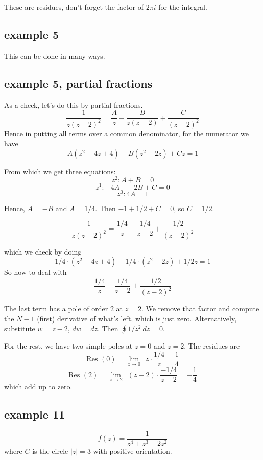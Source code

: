 \documentclass[11pt, oneside]{article}
\begin{document}
These are residues, don't forget the factor of $2 \pi i$ for the integral.

\subsection*{example 5}

This can be done in many ways.

\subsection*{example 5, partial fractions}

\label{sec:ex5PF}

As a check, let's do this by partial fractions.
\[ \frac{1}{z(z-2)^2} = \frac{A}{z} +  \frac{B}{z(z-2)} +  \frac{C}{(z-2)^2}  \]
Hence in putting all terms over a common denominator, for the numerator we have
\[ A(z^2 - 4z + 4) + B(z^2 - 2z) + Cz = 1 \]

From which we get three equations:
\[ z^2:  A + B = 0 \]
\[ z^1: -4A + -2B + C = 0 \]
\[ z^0:  4A = 1 \]

Hence, $A = -B$ and $A = 1/4$. Then $-1 + 1/2 + C = 0$, so $C = 1/2$.

\[ \frac{1}{z(z-2)^2} = \frac{1/4}{z} - \frac{1/4}{z-2} +  \frac{1/2}{(z-2)^2}  \]

which we check by doing
\[ 1/4 \cdot (z^2 - 4z + 4) - 1/4 \cdot (z^2 - 2z) + 1/2 z = 1 \]
So how to deal with 
\[ \frac{1/4}{z} - \frac{1/4}{z-2} +  \frac{1/2}{(z-2)^2}  \]

The last term has a pole of order $2$ at $z = 2$.  We remove that factor and compute the $N-1$ (first) derivative of what's left, which is just zero.  Alternatively, substitute $w = z - 2$, $dw = dz$.  Then $\oint 1/z^2 \ dz = 0$.

For the rest, we have two simple poles at $z=0$ and $z=2$.  The residues are
\[ \text{Res } (0) = \lim_{z \rightarrow 0} \ \ z \cdot \frac{1/4}{z} = \frac{1}{4} \]
\[ \text{Res } (2) = \lim_{z \rightarrow 2} \ \ (z-2) \cdot \frac{-1/4}{z-2} = - \frac{1}{4} \]
which add up to zero.

\subsection*{example  11}

\label{sec:ex11R}

\[ f(z) = \frac{1}{z^4 + z^3 - 2z^2} \]
where $C$ is the circle $|z| = 3$ with positive orientation.
\end{document}
